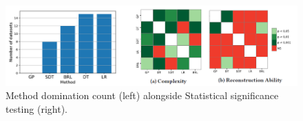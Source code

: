 \begin{center}
\begin{figure}[h]
\includegraphics[width=\columnwidth]{results}
\caption{Method domination count (left) alongside Statistical significance testing (right).}
\label{fig:results}
\end{figure}
\end{center}





